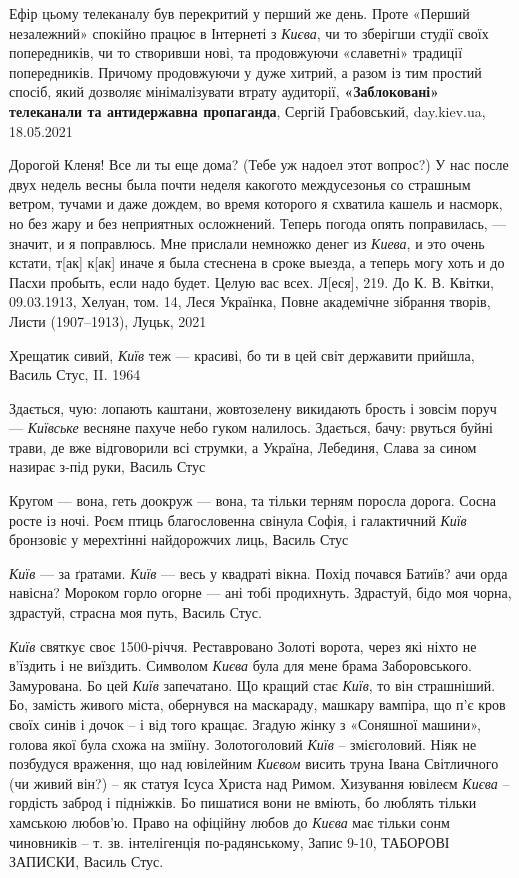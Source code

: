 Ефір цьому телеканалу був перекритий у перший же день. Проте «Перший
незалежний» спокійно працює в Інтернеті з \emph{Києва}, чи то зберігши студії
своїх попередників, чи то створивши нові, та продовжуючи «славетні» традиції
попередників. Причому продовжуючи у дуже хитрий, а разом із тим простий спосіб,
який дозволяє мінімалізувати втрату аудиторії, \textbf{«Заблоковані» телеканали
та антидержавна пропаганда}, Сергій Грабовський, day.kiev.ua, 18.05.2021

Дорогой Кленя! Все ли ты еще дома? (Тебе уж надоел этот вопрос?) У нас после
двух недель весны была почти неделя какого­то междусезонья со страшным ветром,
тучами и даже дождем, во время которого я схватила кашель и насморк, но без
жару и без неприятных осложнений. Теперь погода опять поправилась, — значит, и
я поправлюсь.  Мне прислали немножко денег из \emph{Киева}, и это очень кстати,
т[ак] к[ак] иначе я была стеснена в сроке выезда, а теперь могу хоть и до Пасхи
пробыть, если надо будет. Целую вас всех. Л[еся], 219. До К. В.  Квітки,
09.03.1913, Хелуан, том. 14, Леся Українка, Повне академічне зібрання творів,
Листи (1907–1913), Луцьк, 2021

Хрещатик сивий, \emph{Київ} теж — красиві, бо ти в цей світ державити прийшла,
Василь Стус, II. 1964

Здається, чую: лопають каштани, жовтозелену викидають брость і зовсім поруч —
\emph{Київське} весняне пахуче небо гуком налилось.  Здається, бачу: рвуться
буйні трави, де вже відговорили всі струмки, а Україна, Лебединя, Слава за
сином назирає з-під руки, Василь Стус

Кругом — вона, геть доокруж — вона, та тільки терням поросла дорога.  Сосна
росте із ночі. Роєм птиць благословенна свінула Софія, і галактичний
\emph{Київ} бронзовіє у мерехтінні найдорожчих лиць, Василь Стус

\emph{Київ} — за ґратами. \emph{Київ} — весь у квадраті вікна. Похід почався
Батиїв?  ачи орда навісна?  Мороком горло огорне — ані тобі продихнуть.
Здрастуй, бідо моя чорна, здрастуй, страсна моя путь, Василь Стус.

\emph{Київ} святкує своє 1500-річчя. Реставровано Золоті ворота, через які
ніхто не в'їздить і не виїздить. Символом \emph{Києва} була для мене брама
Заборовського.  Замурована. Бо цей \emph{Київ} запечатано. Що кращий стає
\emph{Київ}, то він страшніший. Бо, замість живого міста, обернувся на
маскараду, машкару вампіра, що п'є кров своїх синів і дочок – і від того
кращає. Згадую жінку з «Соняшної машини», голова якої була схожа на зміїну.
Золотоголовий \emph{Київ} – змієголовий. Ніяк не позбудуся враження, що над
ювілейним \emph{Києвом} висить труна Івана Світличного (чи живий він?) – як
статуя Ісуса Христа над Римом. Хизування ювілеєм \emph{Києва} – гордість заброд
і підніжків. Бо пишатися вони не вміють, бо люблять тільки хамською любов'ю.
Право на офіційну любов до \emph{Києва} має тільки сонм чиновників – т. зв.
інтелігенція по-радянському, Запис 9-10, ТАБОРОВІ ЗАПИСКИ, Василь Стус.

